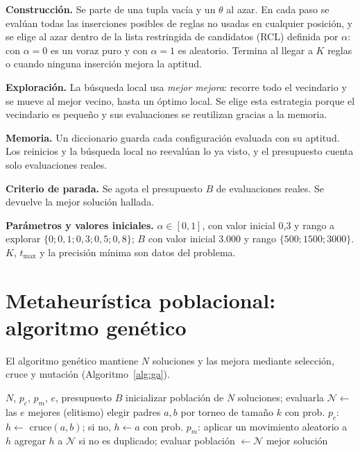 \documentclass[conference]{IEEEtran}
\begin{document}
	\textbf{Construcci\'on.} Se parte de una tupla vac\'ia y un $\theta$ al azar. En cada paso se eval\'uan todas las inserciones posibles de reglas no usadas en cualquier posici\'on, y se elige al azar dentro de la lista restringida de candidatos (RCL) definida por $\alpha$: con $\alpha=0$ es un voraz puro y con $\alpha=1$ es aleatorio. Termina al llegar a $K$ reglas o cuando ninguna inserci\'on mejora la aptitud.
	
	\textbf{Exploraci\'on.} La b\'usqueda local usa \emph{mejor mejora}: recorre todo el vecindario y se mueve al mejor vecino, hasta un \'optimo local. Se elige esta estrategia porque el vecindario es peque\~no y sus evaluaciones se reutilizan gracias a la memoria.
	
	\textbf{Memoria.} Un diccionario guarda cada configuraci\'on evaluada con su aptitud. Los reinicios y la b\'usqueda local no reeval\'uan lo ya visto, y el presupuesto cuenta solo evaluaciones reales.
	
	\textbf{Criterio de parada.} Se agota el presupuesto $B$ de evaluaciones reales. Se devuelve la mejor soluci\'on hallada.
	
	\textbf{Par\'ametros y valores iniciales.} $\alpha\in[0,1]$, con valor inicial 0,3 y rango a explorar $\{0;0{,}1;0{,}3;0{,}5;0{,}8\}$; $B$ con valor inicial 3.000 y rango $\{500;1500;3000\}$. $K$, $t_{\max}$ y la precisi\'on m\'inima son datos del problema.
	
	\section{Metaheur\'istica poblacional: algoritmo gen\'etico}
	
	El algoritmo gen\'etico \cite{gendreau} mantiene $N$ soluciones y las mejora mediante selecci\'on, cruce y mutaci\'on (Algoritmo~\ref{alg:ga}).
	
	\begin{algorithm}[t]
		\caption{Algoritmo gen\'etico}
		\label{alg:ga}
		\small
		\begin{algorithmic}[1]
			\REQUIRE $N$, $p_c$, $p_m$, $e$, presupuesto $B$
			\STATE inicializar poblaci\'on de $N$ soluciones; evaluarla
			\STATE $\mathcal N\leftarrow$ las $e$ mejores (elitismo)
			\STATE elegir padres $a,b$ por torneo de tama\~no $k$
			\STATE con prob. $p_c$: $h\leftarrow$ cruce$(a,b)$; si no, $h\leftarrow a$
			\STATE con prob. $p_m$: aplicar un movimiento aleatorio a $h$
			\STATE agregar $h$ a $\mathcal N$ si no es duplicado; evaluar
			\ENDWHILE
			\STATE poblaci\'on $\leftarrow\mathcal N$
			\ENDWHILE
			\RETURN mejor soluci\'on
		\end{algorithmic}
	\end{algorithm}
	
\end{document}
